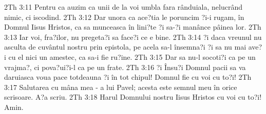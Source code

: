 2Th 3:11  Pentru ca auzim ca unii de la voi umbla fara rânduiala, nelucrând nimic, ci iscodind.
2Th 3:12  Dar unora ca ace?tia le poruncim ?i-i rugam, în Domnul Iisus Hristos, ca sa munceasca în lini?te ?i sa-?i manânce pâinea lor.
2Th 3:13  Iar voi, fra?ilor, nu pregeta?i sa face?i ce e bine.
2Th 3:14  ?i daca vreunul nu asculta de cuvântul nostru prin epistola, pe acela sa-l însemna?i ?i sa nu mai ave?i cu el nici un amestec, ca sa-i fie ru?ine.
2Th 3:15  Dar sa nu-l socoti?i ca pe un vrajma?, ci pova?ui?i-l ca pe un frate.
2Th 3:16  ?i Însu?i Domnul pacii sa va daruiasca voua pace totdeauna ?i în tot chipul! Domnul fie cu voi cu to?i!
2Th 3:17  Salutarea cu mâna mea - a lui Pavel; acesta este semnul meu în orice scrisoare. A?a scriu.
2Th 3:18  Harul Domnului nostru Iisus Hristos cu voi cu to?i! Amin.


